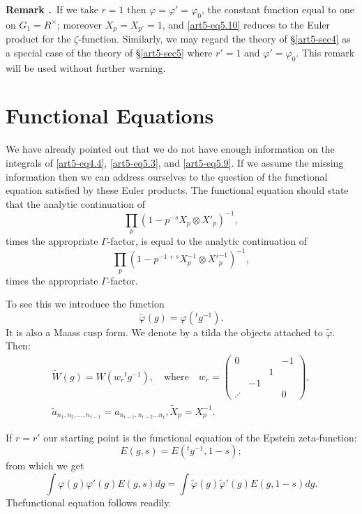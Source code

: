 \medskip
\noindent
{\bf Remark .\label{art5-thm5.11}}~If we take $r=1$ then $\varphi=\varphi'=\varphi_{0}$, the constant function equal to one on $G_{1}=R^{\times}$; moreover $X_{p}=X_{p'}=1$, and \eqref{art5-eq5.10} reduces to the Euler product for the $\zeta$-function. Similarly, we may regard the theory of \S\ref{art5-sec4} as a special case of the theory of \S\ref{art5-sec5} where $r'=1$ and $\varphi'=\varphi_{0}$. This remark will be used without further warning.

\section{Functional Equations}\label{art5-sec6}

We have already pointed out that we do not have enough information on the integrals of \eqref{art5-eq4.4}, \eqref{art5-eq5.3}, and \eqref{art5-eq5.9}. If we assume the missing information then we can address ourselves to the question of the functional equation satisfied by these Euler products. The functional equation should state that the analytic continuation of 
$$
\prod\limits_{p}(1-p^{-s}X_{p}\otimes X'_{p})^{-1},
$$
times the appropriate $\Gamma$-factor, is equal to the analytic continuation of 
$$
\prod\limits_{p}(1-p^{-1+s}X^{-1}_{p}\otimes {X'}^{-1}_{p})^{-1},
$$
times the appropriate $\Gamma$-factor.

To see this we introduce the function
$$
\widetilde{\varphi}(g)=\varphi({}^{t}g^{-1}).
$$
It is also a Maass cusp form. We denote by a tilda the objects attached to $\widetilde{\varphi}$. Then:
\begin{gather*}
\widetilde{W}(g)=W(w_{r}{}^{t}g^{-1}),\quad\text{where}\quad w_{r}=
\left(
\begin{matrix}
0 & & & -1\\
 & & 1 &\\
 & -1 & & \\
\iddots & & & 0
\end{matrix}
\right),\\
\widetilde{a}_{n_{1},n_{2},\ldots,n_{r-1}}=a_{n_{r-1},n_{r-2}\ldots n_{t}},  \widetilde{X}_{p}=X^{-1}_{p}.
\end{gather*}

If $r=r'$ our starting point is the functional equation of the Epstein zeta-function:
$$
E(g,s)=E({}^{t}g^{-1},1-s);
$$
from which we get
$$
\int \varphi(g)\varphi'(g)E(g,s)dg=\int \widetilde{\varphi}(g)\widetilde{\varphi}'(g)E(g,1-s)dg.
$$
The\pageoriginale functional equation follows readily.

